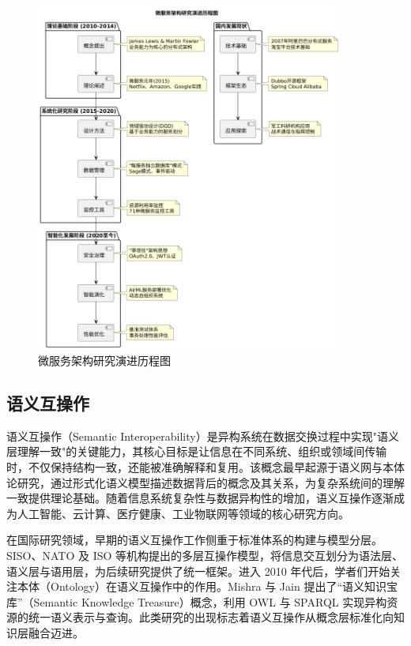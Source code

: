 \begin{figure}[H]
    \centering
    \includegraphics[width=0.9\textwidth,height=0.6\textheight,keepaspectratio]{chapters/fig-0/microservices_research_evolution.png}
    \caption{微服务架构研究演进历程图}
    \label{fig_microservices_research_evolution}
\end{figure}


\subsection{语义互操作}

语义互操作（Semantic Interoperability）是异构系统在数据交换过程中实现"语义层理解一致"的关键能力，其核心目标是让信息在不同系统、组织或领域间传输时，不仅保持结构一致，还能被准确解释和复用。该概念最早起源于语义网与本体论研究，通过形式化语义模型描述数据背后的概念及其关系，为复杂系统间的理解一致提供理论基础。随着信息系统复杂性与数据异构性的增加，语义互操作逐渐成为人工智能、云计算、医疗健康、工业物联网等领域的核心研究方向。

在国际研究领域，早期的语义互操作工作侧重于标准体系的构建与模型分层。SISO、NATO 及 ISO 等机构提出的多层互操作模型，将信息交互划分为语法层、语义层与语用层\cite{SISO_STD_002_2006,CJCSI_6610_01F_2021}，为后续研究提供了统一框架。进入 2010 年代后，学者们开始关注本体（Ontology）在语义互操作中的作用。Mishra 与 Jain 提出了“语义知识宝库”（Semantic Knowledge Treasure）概念，利用 OWL 与 SPARQL 实现异构资源的统一语义表示与查询\cite{Mishra2018Semantic}。此类研究的出现标志着语义互操作从概念层标准化向知识层融合迈进。

